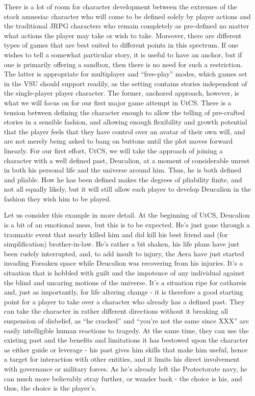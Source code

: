 There is a lot of room for character development between the extremes
of the stock amnesiac character who will come to be defined solely by
player actions and the traditional JRPG characters who remain
completely as pre-defined no matter what actions the player may take
or wish to take. Moreover, there are different types of games that are
best suited to different points in this spectrum. If one wishes to
tell a somewhat particular story, it is useful to have an anchor, but
if one is primarily offering a sandbox, then there is no need for such
a restriction. The latter is appropriate for multiplayer and
``free-play'' modes, which games set in the VSU should support
readily, as the setting contains stories independent of the
single-player player character. The former, anchored approach,
however, is what we will focus on for our first major game attempt in
UtCS. There is a tension between defining the character enough to
allow the telling of pre-crafted stories in a sensible fashion, and
allowing enough flexibility and growth potential that the player feels
that they have control over an avatar of their own will, and are not
merely being asked to bang on buttons until the plot moves forward
linearly. For our first effort, UtCS, we will take the approach of
joining a character with a well defined past, Deucalion, at a moment
of considerable unrest in both his personal life and the universe
around him. Thus, he is both defined and pliable. How he has been
defined makes the degrees of pliability finite, and not all equally
likely, but it will still allow each player to develop Deucalion in
the fashion they wish him to be played.

Let us consider this example in more detail. At the beginning of UtCS,
Deucalion is a bit of an emotional mess, but this is to be
expected. He's just gone through a traumatic event that nearly killed
him and did kill his best friend and (for simplification)
brother-in-law. He's rather a bit shaken, his life plans have just
been rudely interrupted, and, to add insult to injury, the Aera have
just started invading Forsaken space while Deucalion was recovering
from his injuries. It's a situation that is hobbled with guilt and the
impotence of any individual against the blind and uncaring motions of
the universe. It's a situation ripe for catharsis and, just as
importantly, for life altering change - it is therefore a good
starting point for a player to take over a character who already has a
defined past. They can take the character in rather different
directions without it breaking all suspension of disbelief, as ``he
cracked'' and ``you're not the same since XXX'' are easily intelligible
human reactions to tragedy. At the same time, they can use the
existing past and the benefits and limitations it has bestowed upon
the character as either guide or leverage - his past gives him skills
that make him useful, hence a target for interaction with other
entities, and it limits his direct involvement with governance or
military forces. As he's already left the Protectorate navy, he can
much more believably stray further, or wander back - the choice is
his, and thus, the choice is the player's.

